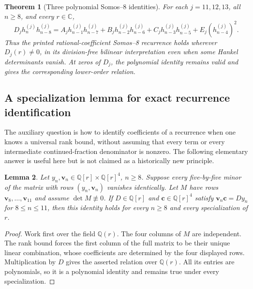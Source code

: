 \documentclass[11pt,a4paper]{article}
\newtheorem{theorem}{Theorem}[section]
\newtheorem{lemma}[theorem]{Lemma}
\theoremstyle{definition}
\theoremstyle{remark}
\begin{document}
\begin{theorem}[Three polynomial Somos--8 identities]\label{retry93:target}
For each $j=11,12,13$, all $n\ge8$, and every $r\in\mathbb C$,
\begin{equation}\label{retry93:identity}
 D_j h_n^{(j)}h_{n-8}^{(j)}
 =A_jh_{n-1}^{(j)}h_{n-7}^{(j)}
 +B_jh_{n-2}^{(j)}h_{n-6}^{(j)}
 +C_jh_{n-3}^{(j)}h_{n-5}^{(j)}
 +E_j(h_{n-4}^{(j)})^2.
\end{equation}
Thus the printed rational-coefficient Somos--8 recurrence holds wherever
$D_j(r)\ne0$, in its division-free bilinear interpretation even when some
Hankel determinants vanish. At zeros of $D_j$, the polynomial identity
remains valid and gives the corresponding lower-order relation.
\end{theorem}

\subsection{A specialization lemma for exact recurrence identification}
The auxiliary question is how to identify coefficients of a recurrence
when one knows a universal rank bound, without assuming that every term
or every intermediate continued-fraction denominator is nonzero.
The following elementary answer is useful here but is not claimed as a
historically new principle.

\begin{lemma}\label{retry93:ranklemma}
Let $y_n,\mathbf v_n\in\mathbb Q[r]\times\mathbb Q[r]^4$, $n\ge8$.
Suppose every five-by-five minor of the matrix with rows
$(y_n,\mathbf v_n)$ vanishes identically. Let $M$ have rows
$\mathbf v_8,\ldots,\mathbf v_{11}$ and assume $\det M\not\equiv0$.
If $D\in\mathbb Q[r]$ and $\mathbf c\in\mathbb Q[r]^4$ satisfy
$\mathbf v_n\mathbf c=Dy_n$ for $8\le n\le11$, then this identity holds
for every $n\ge8$ and every specialization of $r$.
\end{lemma}
\begin{proof}
Work first over the field $\mathbb Q(r)$. The four columns of $M$ are
independent. The rank bound forces the first column of the full matrix
to be their unique linear combination, whose coefficients are determined
by the four displayed rows. Multiplication by $D$ gives the asserted
relation over $\mathbb Q(r)$. All its entries are polynomials, so it is a
polynomial identity and remains true under every specialization.
\end{proof}
\end{document}
